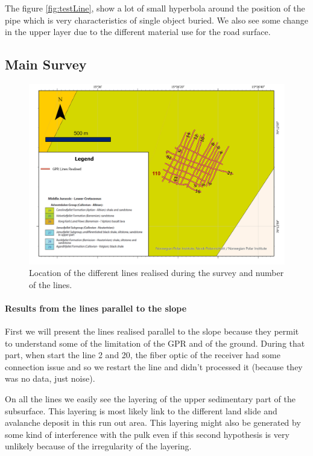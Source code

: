 The figure \ref{fig:testLine}, show a lot of small hyperbola around the position of the pipe which is very characteristics of single object buried. We also see some change in the upper layer due to the different material use for the road surface.


\subsection{Main Survey}

\begin{figure}[H]
    \centering
    \includegraphics[width=\linewidth]{Images/00_Results/GPR LIne.jpg}
    \caption{Location of the different lines realised during the survey and number of the lines.}
    \label{fig:LocGPRLines}
\end{figure}

\paragraph{Results from the lines parallel to the slope} First we will present the lines realised parallel to the slope because they permit to understand some of the limitation of the GPR and of the ground. During that part, when start the line 2 and 20, the fiber optic of the receiver had some connection issue and so we restart the line and didn't processed it (because they was no data, just noise).

On all the lines we easily see the layering of the upper sedimentary part of the subsurface. This layering is most likely link to the different land slide and avalanche deposit in this run out area. This layering might also be generated by some kind of interference with the pulk even if this second hypothesis is very unlikely because of the irregularity of the layering.

